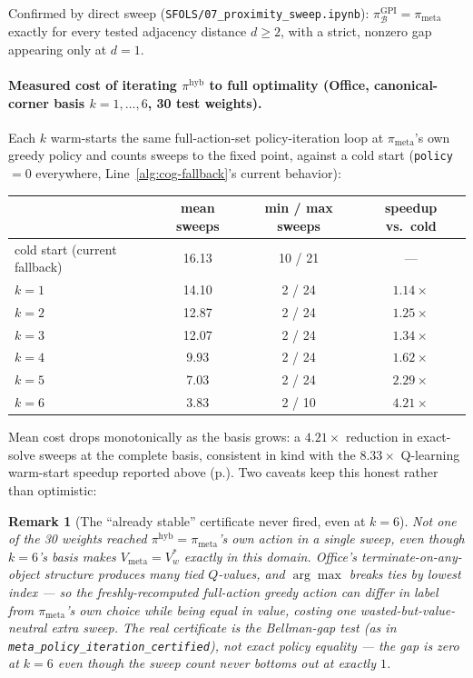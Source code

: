 \documentclass[11pt]{article}
\newtheorem{remark}{Remark}
\begin{document}
Confirmed by direct sweep (\texttt{SFOLS/07\_proximity\_sweep.ipynb}):
$\pi^{\mathrm{GPI}}_{\mathcal B}=\pi_{\mathrm{meta}}$ exactly for every tested adjacency distance $d\ge2$, with a
strict, nonzero gap appearing only at $d=1$.

\paragraph{Measured cost of iterating $\pi^{\mathrm{hyb}}$ to full optimality (Office, canonical-corner basis
$k=1,\dots,6$, 30 test weights).} Each $k$ warm-starts the same full-action-set policy-iteration loop at
$\pi_{\mathrm{meta}}$'s own greedy policy and counts sweeps to the fixed point, against a cold start
(\texttt{policy}$=0$ everywhere, Line~\ref*{alg:cog-fallback}'s current behavior):

\begin{center}
\begin{tabular}{lccc}
\toprule
 & mean sweeps & min / max sweeps & speedup vs.\ cold \\
\midrule
cold start (current fallback) & 16.13 & 10 / 21 & --- \\
$k=1$ & 14.10 & 2 / 24 & $1.14\times$ \\
$k=2$ & 12.87 & 2 / 24 & $1.25\times$ \\
$k=3$ & 12.07 & 2 / 24 & $1.34\times$ \\
$k=4$ & 9.93  & 2 / 24 & $1.62\times$ \\
$k=5$ & 7.03  & 2 / 24 & $2.29\times$ \\
$k=6$ & 3.83  & 2 / 10 & $\mathbf{4.21\times}$ \\
\bottomrule
\end{tabular}
\end{center}

Mean cost drops monotonically as the basis grows: a $4.21\times$ reduction in exact-solve sweeps at the complete
basis, consistent in kind with the $8.33\times$ Q-learning warm-start speedup reported above
(p.\pageref{par:warmstart}). Two caveats keep this honest rather than optimistic:

\begin{remark}[The ``already stable'' certificate never fired, even at $k=6$]
Not one of the 30 weights reached $\pi^{\mathrm{hyb}}=\pi_{\mathrm{meta}}$'s own action in a single sweep, even
though $k=6$'s basis makes $V_{\mathrm{meta}}=V^*_w$ exactly in this domain. Office's terminate-on-any-object
structure produces many tied $Q$-values, and $\arg\max$ breaks ties by lowest index — so the freshly-recomputed
full-action greedy action can differ in \emph{label} from $\pi_{\mathrm{meta}}$'s own choice while being equal in
\emph{value}, costing one wasted-but-value-neutral extra sweep. The real certificate is the Bellman-gap test (as
in \texttt{meta\_policy\_iteration\_certified}), not exact policy equality — the gap is zero at $k=6$ even though
the sweep count never bottoms out at exactly $1$.
\end{remark}
\end{document}
